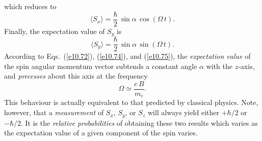 which reduces to
\begin{equation}\label{e10.74}
\langle S_x\rangle = \frac{\hbar}{2}\,\sin\alpha\,\cos(\Omega\,t).
\end{equation}
Finally, the expectation value of $S_y$ is
\begin{equation}\label{e10.75}
\langle S_y\rangle = \frac{\hbar}{2}\,\sin\alpha\,\sin(\Omega\,t).
\end{equation}
According to Eqs.~(\ref{e10.72}), (\ref{e10.74}), and (\ref{e10.75}),
the {\em expectation value}\/ of the spin angular momentum vector subtends
a constant angle $\alpha$ with the $z$-axis, and {\em precesses}\/ about
this axis at the frequency 
\begin{equation}
\Omega \simeq \frac{e\,B}{m_e}.
\end{equation}
This behaviour is actually equivalent to that predicted by classical physics.
Note, however, that a {\em measurement}\/ of $S_x$, $S_y$, or $S_z$ will always
yield either $+\hbar/2$ or $-\hbar/2$. It is the {\em relative probabilities}\/
of obtaining these two results which varies as the expectation value
of a given component of the spin varies.

